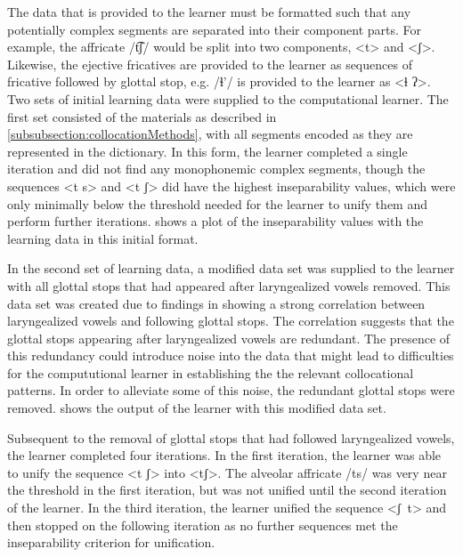 \documentclass[output=paper,colorlinks,citecolor=brown]{langscibook}
\begin{document}
The data that is provided to the learner must be formatted such that any potentially complex segments are separated into their component parts. For example, the affricate {/t͡ʃ/} would be split into two components, <{t}> and <{ʃ}>. Likewise, the ejective fricatives are provided to the learner as sequences of fricative followed by glottal stop, e.g. {/ɬ'/} is provided to the learner as <ɬ ʔ>. Two sets of initial learning data were supplied to the computational learner. The first set consisted of the materials as described in \ref{subsubsection:collocationMethods}, with all segments encoded as they are represented in the dictionary. In this form, the learner completed a single iteration and did not find any monophonemic complex segments, though the sequences <t s> and <t {ʃ}> did have the highest inseparability values, which were only minimally below the threshold needed for the learner to unify them and perform further iterations.  shows a plot of the inseparability values with the learning data in this initial format.

In the second set of learning data, a modified data set was supplied to the learner with all glottal stops that had appeared after laryngealized vowels removed. This data set was created due to findings in \citet{Puderbaugh2019} showing a strong correlation between laryngealized vowels and following glottal stops. The correlation suggests that the glottal stops appearing after laryngealized vowels are redundant. The presence of this redundancy could introduce noise into the data that might lead to difficulties for the compututional learner in establishing the the relevant collocational patterns. In order to alleviate some of this noise, the redundant glottal stops were removed.  shows the output of the learner with this modified data set.

Subsequent to the removal of glottal stops that had followed laryngealized vowels, the learner completed four iterations. In the first iteration, the learner was able to unify the sequence <{t ʃ}> into <{tʃ}>. The alveolar affricate {/ts/} was very near the threshold in the first iteration, but was not unified until the second iteration of the learner. In the third iteration, the learner unified the sequence \mbox{<{ʃ t}>} and then stopped on the following iteration as no further sequences met the inseparability criterion for unification.
\end{document}
